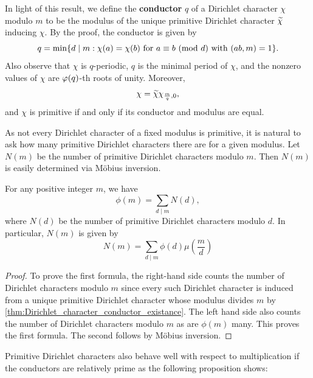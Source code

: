     In light of this result, we define the \textbf{conductor} \(q\) of a Dirichlet character \(\chi\) modulo \(m\) to be the modulus of the unique primitive Dirichlet character \(\widetilde{\chi}\) inducing \(\chi\). By the proof, the conductor is given by
    \[
      q = \min\{d \mid m:\chi(a) = \chi(b) \text{ for } a \equiv b \ (\mathrm{mod}\text{ }d) \text{ with } (ab,m) = 1\}.
    \]
    Also observe that \(\chi\) is \(q\)-periodic, \(q\) is the minimal period of \(\chi\), and the nonzero values of \(\chi\) are \(\varphi(q)\)-th roots of unity. Moreover,
    \[
      \chi = \widetilde{\chi}\chi_{\frac{m}{q},0},
    \]
    and \(\chi\) is primitive if and only if its conductor and modulus are equal.
    
    As not every Dirichlet character of a fixed modulus is primitive, it is natural to ask how many primitive Dirichlet characters there are for a given modulus. Let \(N(m)\) be the number of primitive Dirichlet characters modulo \(m\). Then \(N(m)\) is easily determined via M\"obius inversion.

    \begin{proposition}
      For any positive integer \(m\), we have
      \[
        \phi(m) = \sum_{d \mid m}N(d),
      \]
      where \(N(d)\) be the number of primitive Dirichlet characters modulo \(d\). In particular, \(N(m)\) is given by
      \[
        N(m) = \sum_{d \mid m}\phi(d)\mu\left(\frac{m}{d}\right)
      \]
    \end{proposition}
    \begin{proof}
      To prove the first formula, the right-hand side counts the number of Dirichlet characters modulo \(m\) since every such Dirichlet character is induced from a unique primitive Dirichlet character whose modulus divides \(m\) by \cref{thm:Dirichlet_character_conductor_existance}. The left hand side also counts the number of Dirichlet characters modulo \(m\) as are \(\phi(m)\) many. This proves the first formula. The second follows by M\"obius inversion.
    \end{proof}

    Primitive Dirichlet characters also behave well with respect to multiplication if the conductors are relatively prime as the following proposition shows:

